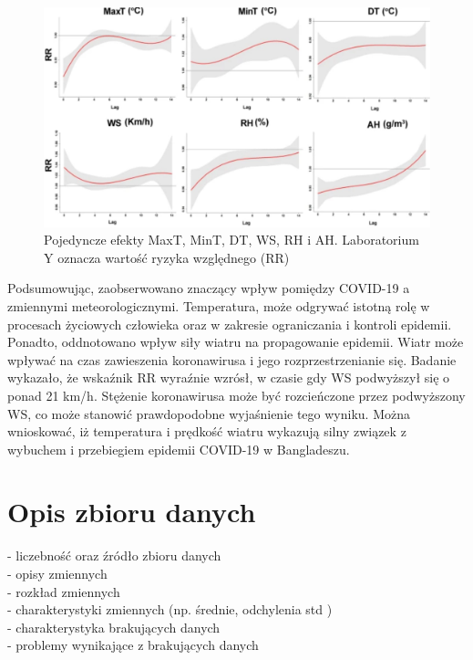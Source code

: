 \documentclass[polish, twoside, 12pt, a4paper]{article}
\theoremstyle{definition}
\theoremstyle{plain}
\theoremstyle{remark}
\begin{document}
\begin{figure}[h]
\centering
\includegraphics[width=15cm]{clmate-factors.jpg}
\caption{Pojedyncze efekty MaxT, MinT, DT, WS, RH i AH. Laboratorium Y oznacza wartość ryzyka względnego (RR)}
\end{figure}

Podsumowując, zaobserwowano znaczący wpływ pomiędzy COVID-19 a zmiennymi meteorologicznymi. Temperatura, może odgrywać istotną rolę w procesach życiowych człowieka oraz w zakresie ograniczania i kontroli epidemii. Ponadto, oddnotowano wpływ siły wiatru na propagowanie epidemii. Wiatr może wpływać na czas zawieszenia koronawirusa i jego rozprzestrzenianie się. Badanie wykazało, że wskaźnik RR wyraźnie wzrósł, w czasie gdy WS podwyższył się o ponad 21 km/h. Stężenie koronawirusa może być rozcieńczone przez podwyższony WS, co może stanowić prawdopodobne wyjaśnienie tego wyniku. Można wnioskować, iż temperatura i prędkość wiatru wykazują silny związek z wybuchem i przebiegiem epidemii COVID-19 w Bangladeszu. \cite{hasanuzzaman2020}



\clearpage
\section{Opis zbioru danych}

- liczebność oraz źródło zbioru danych \\
- opisy zmiennych \\
- rozkład zmiennych \\
- charakterystyki zmiennych (np. średnie, odchylenia std ) \\
- charakterystyka brakujących danych \\
- problemy wynikające z brakujących danych
\end{document}
